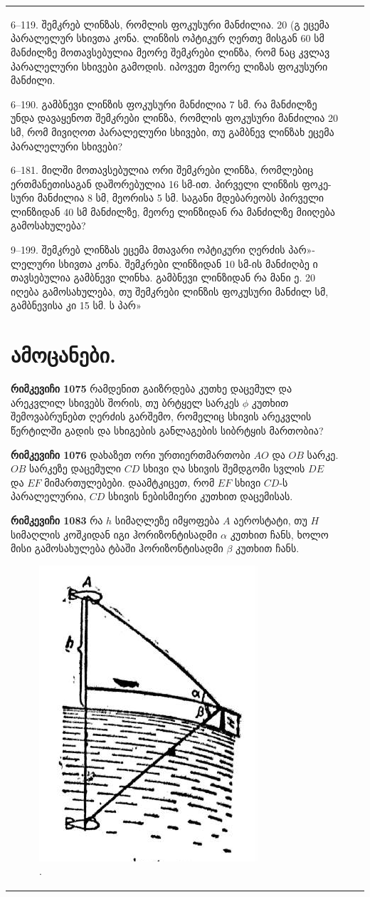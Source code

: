 \documentclass{book}
\begin{document}
\begin{tabular}{|l|c|c|}
6--119. შემკრებ ლინზას, რომლის ფოკუსური მანძილია. 20 (გ
ეცემა პარალელურ სხივთა კონა. ლინზის ოპტიკურ ღერთე მისგან
60 სმ მანძილზე მოთავსებულია მეორე შემკრები ლინზა, რომ
ნაც კვლავ პარალელური სხივები გამოდის. იპოვეთ მეორე ლიზას
ფოკუსური მანძილი.

6--190. გამბნევი ლინზის ფოკუსური მანძილია 7 სმ. რა მანძილზე
უნდა დავაყენოთ შემკრები ლინზა, რომლის ფოკუსური მანძილია 20
სმ, რომ მივიღოთ პარალელური სხივები, თუ გამბნევ ლინზახ ეცემა
პარალელური სხივები?

6--181. მილში მოთავსებულია ორი შემკრები ლინზა, რომლებიც
ერთმანეთისაგან დაშორებულია 16 სმ-ით. პირველი ლინზის ფოკე-
სური მანძილია 8 სმ, მეორისა 5 სმ. საგანი მდებარეობს პირველი
ლინზიდან 40 სმ მანძილზე, მეორე ლინზიდან რა მანძილზე მიიღება
გამოსახულება?

9--199. შემკრებ ლინზას ეცემა მთავარი ოპტიკური ღერძის პარ»-
ლელური სხივთა კონა. შემკრები ლინზიდან 10 სმ-ის მანძიღბე ი
თავსებულია გამბნევი ლინხა. გამბნევი ლინზიდან რა მანი ე. 20
იღება გამოსახულება, თუ შემკრები ლინზის ფოკუსური მანძილ
სმ, გამბნევისა კი 15 სმ. ს პარ»

\section{ამოცანები.}

\textbf{რიმკევიჩი 1075} რამდენით გაიზრდება კუთხე დაცემულ და არეკვლილ სხივებს შორის, თუ ბრტყელ სარკეს $\phi$ კუთხით შემოვაბრუნებთ ღერძის გარშემო, რომელიც სხივის არეკვლის წერტილში გადის და სხიგების განლაგების სიბრტყის მართობია?

\textbf{რიმკევიჩი 1076} დახაზეთ ორი ურთიერთმართობი $AO$ და $OB$ სარკე. $OB$ სარკეზე დაცემული $CD$ სხივი ღა სხივის შემდგომი სვლის $DE$ და $EF$ მიმართულებები. დაამტკიცეთ, რომ $EF$ სხივი $CD$-ს პარალელურია, $CD$ სხივის ნებისმიერი კუთხით დაცემისას.

\textbf{რიმკევიჩი 1083} რა $h$ სიმაღლეზე იმყოფება $A$ აეროსტატი, თუ $H$ სიმაღლის კოშკიდან იგი ჰორიზონტისადმი $\alpha$ კუთხით ჩანს, ხოლო მისი გამოსახულება ტბაში ჰორიზონტისადმი $\beta$ კუთხით ჩანს.
		\begin{figure}[h]
		   \centering
           \includegraphics[width=0.5\columnwidth]{figures/1083}
           \caption{.}
           \label{fig:1083}
        \end{figure}


\end{tabular}
\end{document}
